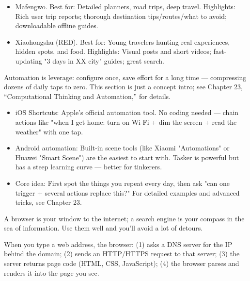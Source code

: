 
\begin{itemize}
  \item Mafengwo. Best for: Detailed planners, road trips, deep travel. Highlights: Rich user trip reports; thorough destination tips/routes/what to avoid; downloadable offline guides.
  \item Xiaohongshu (RED). Best for: Young travelers hunting real experiences, hidden spots, and food. Highlights: Visual posts and short videos; fast-updating "3 days in XX city" guides; great search.
\end{itemize}


Automation is leverage: configure once, save effort for a long time — compressing dozens of daily taps to zero. This section is just a concept intro; see Chapter 23, “Computational Thinking and Automation,” for details.

\begin{itemize}
  \item iOS Shortcuts: Apple's official automation tool. No coding needed — chain actions like "when I get home: turn on Wi-Fi + dim the screen + read the weather" with one tap.
  \item Android automation: Built-in scene tools (like Xiaomi "Automations" or Huawei "Smart Scene") are the easiest to start with. Tasker is powerful but has a steep learning curve — better for tinkerers.
  \item Core idea: First spot the things you repeat every day, then ask "can one trigger + several actions replace this?" For detailed examples and advanced tricks, see Chapter 23.
\end{itemize}


A browser is your window to the internet; a search engine is your compass in the sea of information. Use them well and you'll avoid a lot of detours.


When you type a web address, the browser: (1) asks a DNS server for the IP behind the domain; (2) sends an HTTP/HTTPS request to that server; (3) the server returns page code (HTML, CSS, JavaScript); (4) the browser parses and renders it into the page you see.


